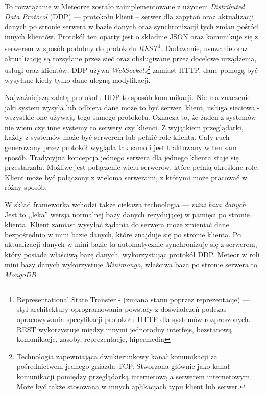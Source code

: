 To rozwiązanie w Meteorze zostało zaimplementowane z użyciem \emph{Distributed Data Protocol} (DDP) --- protokołu klient -- serwer dla zapytań oraz aktualizacji danych po stronie serwera w bazie danych oraz synchronizacji tych zmian pośród innych klientów. Protokół ten oparty jest o składnie JSON oraz komunikuje się z serwerem w sposób podobny do protokołu \emph{REST}\footnote{Representational State Transfer - (zmiana stanu poprzez reprezentacje) --- styl architektury oprogramowania powstały z doświadczeń podczas opracowywania specyfikacji protokołu HTTP dla systemów rozproszonych. REST wykorzystuje między innymi jednorodny interfejs, bezstanową komunikację, zasoby, reprezentacje, hipermedia\cite{restWiki}}. Dodawanie, usuwanie oraz aktualizację są rozsyłane przez sieć oraz obsługiwane przez docelowe urządzenia, usługi oraz klientów. DDP używa \emph{WebSockets}\footnote{Technologia zapewniająca dwukierunkowy kanał komunikacji za pośrednictwem jednego gniazda TCP. Stworzona głównie jako kanał komunikacji pomiędzy przeglądarką internetową a serwerem internetowym. Może być także stosowana w innych aplikacjach typu klient lub serwer.\cite{wsWiki}} zamiast HTTP, dane pomogą być wysyłane kiedy tylko dane ulegną modyfikacji\cite{strack15}.

Najważniejszą zaletą protokołu DDP to sposób komunikacji. Nie ma znaczenie jaki system wysyła lub odbiera dane może to być serwer, klient, usługa sieciowa - wszystkie one używają tego samego protokołu. Oznacza to, że żaden z systemów nie wiem czy inne systemy to serwery czy klienci. Z wyjątkiem przeglądarki, każdy z systemów może być serwerem lub pełnić role klienta. Cały ruch generowany przez protokół wygląda tak samo i jest traktowany w ten sam sposób. Tradycyjna koncepcja jednego serwera dla jednego klienta staje się przestarzała. Możliwe jest połączenie wielu serwerów, które pełnią określone role. Klient może być połączony z wieloma serwerami, z którymi może pracować w różny sposób\cite{strack15}. 

W skład frameworka wchodzi także ciekawa technologia --- \emph{mini baza danych}. Jest to ,,leka'' wersja normalnej bazy danych rezydującej w pamięci po stronie klienta. Klient zamiast wysyłać żądania do serwera może zmieniać dane bezpośrednio w mini bazie danych, które znajduje się po stronie klienta. Po aktualizacji danych w mini bazie ta automatycznie synchronizuje się z serwerem, który posiada właściwą bazę danych, wykorzystując protokół DDP. Meteor w roli mini bazy danych wykorzystuje \emph{Minimongo}, właściwa baza po stronie serwera to \emph{MongoDB}\cite{strack15}.

